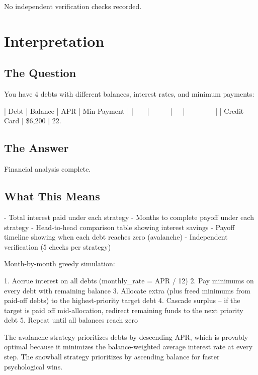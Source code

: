 \documentclass[11pt, a4paper]{article}
\begin{document}
No independent verification checks recorded.

\section{Interpretation}

\subsection{The Question}
You have 4 debts with different balances, interest rates, and minimum payments:

| Debt | Balance | APR | Min Payment |
|------|---------|-----|-------------|
| Credit Card | \$6,200 | 22.

\subsection{The Answer}

\begin{polyainsight}[title={Bottom Line}]
Financial analysis complete.
\end{polyainsight}

\subsection{What This Means}

- Total interest paid under each strategy
- Months to complete payoff under each strategy
- Head-to-head comparison table showing interest savings
- Payoff timeline showing when each debt reaches zero (avalanche)
- Independent verification (5 checks per strategy)

Month-by-month greedy simulation:

1. Accrue interest on all debts (monthly\_rate = APR / 12)
2. Pay minimums on every debt with remaining balance
3. Allocate extra (plus freed minimums from paid-off debts) to the
   highest-priority target debt
4. Cascade surplus -- if the target is paid off mid-allocation, redirect
   remaining funds to the next priority debt
5. Repeat until all balances reach zero

The avalanche strategy prioritizes debts by descending APR, which is provably
optimal because it minimizes the balance-weighted average interest rate at every
step. The snowball strategy prioritizes by ascending balance for faster
psychological wins.
\end{document}
